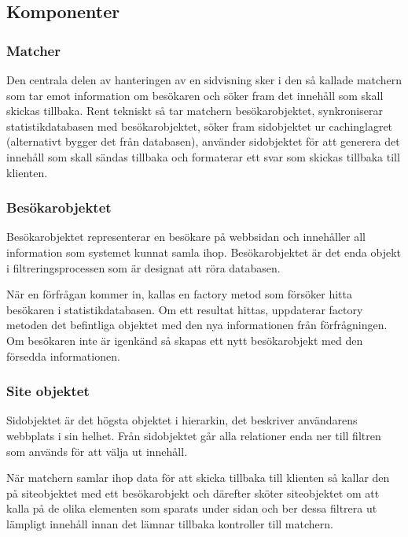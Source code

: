 \subsection{Komponenter}

\subsubsection{Matcher}

Den centrala delen av hanteringen av en sidvisning sker i den så kallade matchern som tar emot information om besökaren och söker fram det innehåll som skall skickas tillbaka. Rent tekniskt så tar matchern besökarobjektet, synkroniserar statistikdatabasen med besökarobjektet, söker fram sidobjektet ur cachinglagret (alternativt bygger det från databasen), använder sidobjektet för att generera det innehåll som skall sändas tillbaka och formaterar ett svar som skickas tillbaka till klienten.

\subsubsection{Besökarobjektet}

Besökarobjektet representerar en besökare på webbsidan och innehåller all information som systemet kunnat samla ihop. Besökarobjektet är det enda objekt i filtreringsprocessen som är designat att röra databasen.

När en förfrågan kommer in, kallas en factory metod som försöker hitta besökaren i statistikdatabasen. Om ett resultat hittas, uppdaterar factory metoden det befintliga objektet med den nya informationen från förfrågningen. Om besökaren inte är igenkänd så skapas ett nytt besökarobjekt med den försedda informationen.

\subsubsection{Site objektet}



Sidobjektet är det högsta objektet i hierarkin, det beskriver användarens webbplats i sin helhet. Från sidobjektet går alla relationer enda ner till filtren som används för att välja ut innehåll.

När matchern samlar ihop data för att skicka tillbaka till klienten så kallar den på siteobjektet med ett besökarobjekt och därefter sköter siteobjektet om att kalla på de olika elementen som sparats under sidan och ber dessa filtrera ut lämpligt innehåll innan det lämnar tillbaka kontroller till matchern.

